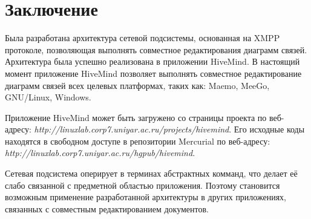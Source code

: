 \newpage

\chapter*{Заключение}


Была разработана архитектура сетевой подсистемы, основанная на
XMPP протоколе, позволяющая выполнять совместное редактирования диаграмм связей.
Архитектура была успешно реализована в приложении HiveMind. В настоящий момент
приложение HiveMind позволяет выполнять совместное редактирование диаграмм
связей всех целевых платформах, таких как: Maemo, MeeGo, GNU/Linux, Windows.

Приложение HiveMind может быть загружено со страницы проекта по веб-адресу:
\emph{http://linuxlab.corp7.uniyar.ac.ru/projects/hivemind}. Его исходные коды
находятся в свободном доступе в репозитории Mercurial по веб-адресу:
\emph{http://linuxlab.corp7.uniyar.ac.ru/hgpub/hivemind}.

Сетевая подсистема оперирует в терминах абстрактных комманд, что делает её
слабо связанной с предметной областью приложения. Поэтому становится возможным
применение разработанной архитектуры в других приложениях, связанных с
совместным редактированием документов.
